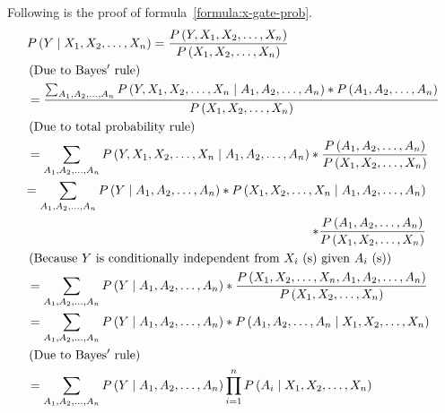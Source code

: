 \documentclass{article}
\numberwithin{equation}{section}
\numberwithin{figure}{section}
\numberwithin{table}{section}
\begin{document}
Following is the proof of formula~\ref{formula:x-gate-prob}.
\begin{align*}
&P\left(Y\mathrel{\left|\vphantom{Y X_1,X_2,\dots ,X_n}\right.\kern-\nulldelimiterspace}X_1,X_2,\dots ,X_n\right)=\frac{P\left(Y,X_1,X_2,\dots ,X_n\right)}{P\left(X_1,X_2,\dots ,X_n\right)}\\
&\left(\mathrm{Due\ to\ Bayes'\ rule}\right)\\
&=\frac{\sum_{A_1,A_2,\dots ,A_n}{P\left(Y,X_1,X_2,\dots ,X_n\mathrel{\left|\vphantom{Y,X_1,X_2,\dots ,X_n A_1,A_2,\dots ,A_n}\right.\kern-\nulldelimiterspace}A_1,A_2,\dots ,A_n\right)*P\left(A_1,A_2,\dots ,A_n\right)}}{P\left(X_1,X_2,\dots ,X_n\right)}\\
&\left(\mathrm{Due\ to\ total\ probability\ rule}\right)\\
&=\sum_{A_1,A_2,\dots ,A_n}{P\left(Y,X_1,X_2,\dots ,X_n\mathrel{\left|\vphantom{Y,X_1,X_2,\dots ,X_n A_1,A_2,\dots ,A_n}\right.\kern-\nulldelimiterspace}A_1,A_2,\dots ,A_n\right)*\frac{P\left(A_1,A_2,\dots ,A_n\right)}{P\left(X_1,X_2,\dots ,X_n\right)}}\\
&\begin{aligned}
=\sum_{A_1,A_2,\dots ,A_n}{P\left(Y\mathrel{\left|\vphantom{Y A_1,A_2,\dots ,A_n}\right.\kern-\nulldelimiterspace}A_1,A_2,\dots ,A_n\right)*P\left(X_1,X_2,\dots ,X_n\mathrel{\left|\vphantom{X_1,X_2,\dots ,X_n A_1,A_2,\dots ,A_n}\right.\kern-\nulldelimiterspace}A_1,A_2,\dots ,A_n\right)}\\
*\frac{P\left(A_1,A_2,\dots ,A_n\right)}{P\left(X_1,X_2,\dots ,X_n\right)}
\end{aligned}\\
&\left(\mathrm{Because}\ Y\ \mathrm{is\ conditionally\ independent\ from}\ X_i\ \mathrm{(s)}\ \mathrm{given}\ A_i\ \mathrm{(s)}\right)\\
&=\sum_{A_1,A_2,\dots ,A_n}{P\left(Y\mathrel{\left|\vphantom{Y A_1,A_2,\dots ,A_n}\right.\kern-\nulldelimiterspace}A_1,A_2,\dots ,A_n\right)*\frac{P\left(X_1,X_2,\dots ,X_n,A_1,A_2,\dots ,A_n\right)}{P\left(X_1,X_2,\dots ,X_n\right)}}\\
&=\sum_{A_1,A_2,\dots ,A_n}{P\left(Y\mathrel{\left|\vphantom{Y A_1,A_2,\dots ,A_n}\right.\kern-\nulldelimiterspace}A_1,A_2,\dots ,A_n\right)*P\left(A_1,A_2,\dots ,A_n\mathrel{\left|\vphantom{A_1,A_2,\dots ,A_n X_1,X_2,\dots ,X_n}\right.\kern-\nulldelimiterspace}X_1,X_2,\dots ,X_n\right)}\\
&\left(\mathrm{Due\ to\ Bayes'\ rule}\right)\\
&=\sum_{A_1,A_2,\dots ,A_n}{P\left(Y\mathrel{\left|\vphantom{Y A_1,A_2,\dots ,A_n}\right.\kern-\nulldelimiterspace}A_1,A_2,\dots ,A_n\right)\prod^n_{i=1}{P\left(A_i\mathrel{\left|\vphantom{A_i X_1,X_2,\dots ,X_n}\right.\kern-\nulldelimiterspace}X_1,X_2,\dots ,X_n\right)}}\\

\end{align*}
\end{document}
